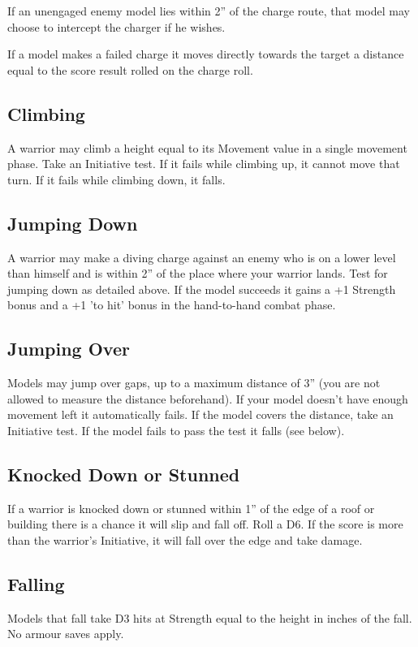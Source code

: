 If an unengaged enemy model lies within 2” of the charge route, that
model may choose to intercept the charger if he
wishes. 

If a model makes a failed charge it moves directly towards the target a distance equal to the score result rolled on the charge roll.


\subsection*{Climbing}
A warrior may climb a height equal to its Movement
value in a single movement phase. Take an Initiative
test. If it fails while climbing up, it cannot move that
turn. If it fails while climbing down, it falls.

\subsection*{Jumping Down}
A warrior may make a diving charge against an
enemy who is on a lower level than himself and is
within 2” of the place where your warrior lands. Test
for jumping down as detailed above. If the model
succeeds it gains a +1 Strength bonus and a +1 'to
hit' bonus in the hand-to-hand combat phase.

\subsection*{Jumping Over}
Models may jump over gaps, up to a maximum
distance of 3” (you are not allowed to measure the
distance beforehand). If your model doesn't have
enough movement left it automatically fails.
If the model covers the distance, take an Initiative
test. If the model fails to pass the test it falls (see
below).

\subsection*{Knocked Down or Stunned}
If a warrior is knocked down or stunned within 1” of
the edge of a roof or building there is a chance it
will slip and fall off. Roll a D6. If the score is more
than the warrior's Initiative, it will fall over the edge
and take damage.

\subsection*{Falling}
Models that fall take D3 hits at Strength equal to the
height in inches of the fall. No armour saves apply.

